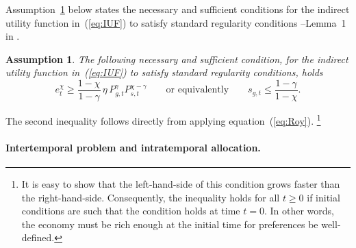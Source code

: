 \documentclass[12pt,a4paper]{article}
\newtheorem{assumption}{Assumption}
\newcommand{\red}[1]{\textcolor{red}{#1}} %
\begin{document}
Assumption~\ref{ass:Boopart_Lemma} below states the necessary and sufficient conditions for the indirect utility function in~(\ref{eq:IUF}) to satisfy standard regularity conditions --Lemma~1 in \cite{Boppart_2014}.
\begin{assumption}\label{ass:Boopart_Lemma}
The following necessary and sufficient condition, for the indirect utility function in~(\ref{eq:IUF}) to satisfy standard regularity conditions, holds
\[
e_t^\chi \geq  \frac{1 - \chi}{1 - \gamma}\, \eta\, P_{g,t}^\gamma P_{s,t}^{\chi - \gamma}
\qquad \text{or equivalently} \qquad
s_{g,t} \leq \frac{1 - \gamma}{1 - \chi} .
\]
\end{assumption}
The second inequality follows directly from applying equation~(\ref{eq:Roy}).%
\footnote{
It is easy to show that the left-hand-side of this condition grows faster than the right-hand-side. Consequently, the inequality holds for all $t\geq 0$ if initial conditions are such that the condition holds at time $t=0$. In other words, the economy must be rich enough at the initial time for preferences be well-defined.}
  


\paragraph{Intertemporal problem and intratemporal allocation.}
\end{document}
